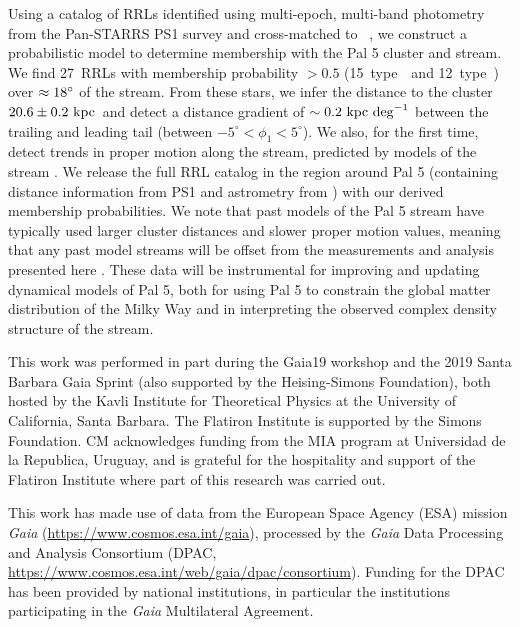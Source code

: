 \documentclass[twocolumn]{aastex63}
\newcommand{\sa}[1]{{\color{teal} SP: #1}}
\newcommand{\clderr}{\ensuremath{20.6 \pm 0.2~\kpc}}
\newcommand{\NRRL}{27}     %
\newcommand{\NRRab}{15}    %
\newcommand{\NRRc}{12}     %
\begin{document}
Using a catalog of RRLs identified using multi-epoch, multi-band photometry from the Pan-STARRS PS1 survey and cross-matched to \Gaia\ , we construct a probabilistic model to determine membership with the Pal 5 cluster and stream.
We find \NRRL\ RRLs with membership probability $>0.5$ (\NRRab\ type~\typeab\ and \NRRc\ type~\typec) over $\approx 18\mbox{$^\circ$}$ of the stream.
From these stars, we infer the distance to the cluster \clderr\ and detect a distance gradient of $\sim 0.2~\mathrm{kpc}~{\rm deg}^{-1}$ between the trailing and leading tail (between $-5^\circ < \phi_1 < 5^\circ$).
We also, for the first time, detect trends in proper motion along the stream, predicted by models of the stream \citep[e.g.,][]{Pearson:2017}.
We release the full RRL catalog in the region around Pal 5 (containing distance information from PS1 and astrometry from \Gaia) with our derived membership probabilities.
We note that past models of the Pal 5 stream have typically used larger cluster distances and slower proper motion values, meaning that any past model streams will be offset from the measurements and analysis presented here \citep[e.g.,][]{Kuepper:2015, Erkal:2017, Pearson:2017}.
These data will be instrumental for improving and updating dynamical models of Pal 5, both for using Pal 5 to constrain the global matter distribution of the Milky Way and in interpreting the observed complex density structure of the stream.


\acknowledgments

This work was performed in part during the Gaia19 workshop and the 2019 Santa Barbara Gaia Sprint (also supported by the Heising-Simons Foundation), both hosted by the Kavli Institute for Theoretical Physics at the University of California, Santa Barbara. The Flatiron Institute is supported by the Simons Foundation. CM acknowledges funding from the MIA program at Universidad de la Republica, Uruguay, and is grateful for the hospitality and support of the Flatiron Institute where part of this research was carried out.

This work has made use of data from the European Space Agency (ESA) mission
{\it Gaia} (\url{https://www.cosmos.esa.int/gaia}), processed by the {\it Gaia}
Data Processing and Analysis Consortium (DPAC,
\url{https://www.cosmos.esa.int/web/gaia/dpac/consortium}). Funding for the DPAC
has been provided by national institutions, in particular the institutions
participating in the {\it Gaia} Multilateral Agreement.
\end{document}
